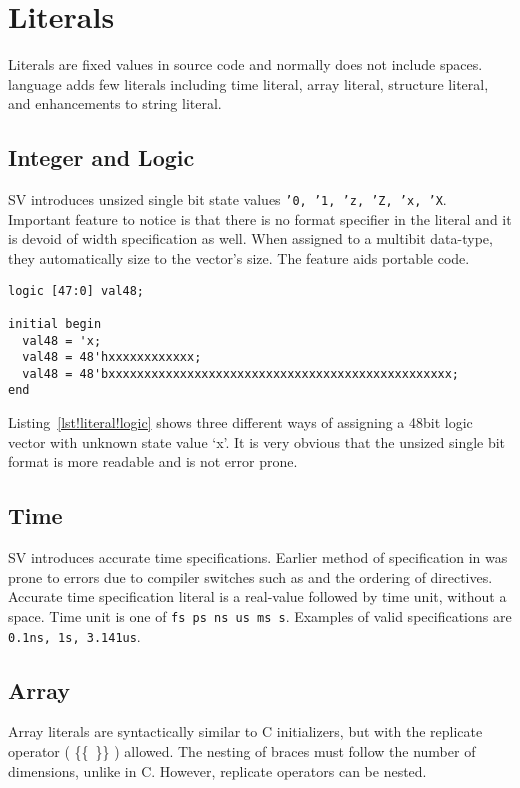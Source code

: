 \chapter{Literals}
Literals are fixed values in source code and normally does not
include spaces. \lsvlog language adds few literals including
time literal, array literal, structure literal, and
enhancements to string literal.

\section{Integer and Logic}
SV introduces unsized single bit state values \texttt{'0, '1, 'z, 'Z,
  'x, 'X}. Important feature to notice is that there is no format
specifier in the literal and it is devoid of width specification as
well. When assigned to a multibit data-type, they automatically size
to the vector's size. The feature aids portable code.
\begin{lstlisting}[label=lst!literal!logic,caption=Unsized literal usage]
logic [47:0] val48;

initial begin
  val48 = 'x;
  val48 = 48'hxxxxxxxxxxxx;
  val48 = 48'bxxxxxxxxxxxxxxxxxxxxxxxxxxxxxxxxxxxxxxxxxxxxxxxx;
end
\end{lstlisting}
Listing~\ref{lst!literal!logic} shows three different ways of
assigning a 48bit logic vector with unknown state value `x'. It is
very obvious that the unsized single bit format is more readable and
is not error prone.

\section{Time}
SV introduces accurate time specifications. Earlier method of
specification in \lvlog was prone to errors due to compiler
switches such as  and the ordering of
 directives. Accurate time specification literal is a
real-value followed by time unit, without a space. Time unit is one of
\texttt{fs ps ns us ms s}. Examples of valid specifications are
\texttt{0.1ns, 1s, 3.141us}.

\section{Array}
Array literals are syntactically similar to C initializers, but with
the replicate operator ( \{\{~\}\} ) allowed.  The nesting of braces
must follow the number of dimensions, unlike in C. However, replicate
operators can be nested.

